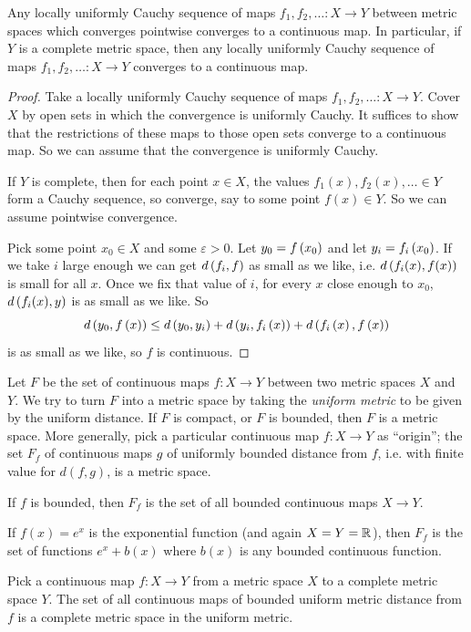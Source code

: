 \begin{lemma}\label{lemma:complete.converg}
Any locally uniformly Cauchy sequence of maps \(f_1, f_2, \dots \colon X \to Y\) between metric spaces which converges pointwise converges to a continuous map.
In particular, if \(Y\) is a complete metric space, then any locally uniformly Cauchy sequence of maps \(f_1, f_2, \dots \colon X \to Y\) converges to a continuous map.
\end{lemma}
\begin{proof}
Take a locally uniformly Cauchy sequence of maps \(f_1, f_2, \dots \colon X \to Y\).
Cover \(X\) by open sets in which the convergence is uniformly Cauchy.
It suffices to show that the restrictions of these maps to those open sets converge to a continuous map.
So we can assume that the convergence is uniformly Cauchy.

If \(Y\) is complete, then for each point \(x \in X\), the values \(f_1(x), f_2(x), \dots \in Y\) form a Cauchy sequence, so converge, say to some point \(f(x) \in Y\).
So we can assume pointwise convergence.

Pick some point \(x_0 \in X\) and some \(\varepsilon > 0\).
Let \(y_0=f\left(x_0\right)\) and let \(y_i=f_i\left(x_0\right)\).
If we take \(i\) large enough we can get \(d\left(f_i,f\right)\) as small as we like, i.e. \(d\left(f_i(x),f(x)\right)\) is small for all \(x\).
Once we fix that value of \(i\), for every \(x\) close enough to \(x_0\), \(d\left(f_i(x),y\right)\) is as small as we like.
So 
\[
d\left(y_0,f\left(x\right)\right) 
\le 
d\left(y_0,y_i\right) 
+
d\left(y_i,f_i\left(x\right)\right) 
+
d\left(f_i\left(x\right),f\left(x\right)\right) 
\]
is as small as we like, so \(f\) is continuous.
\end{proof}
Let \(F\) be the set of continuous maps \(f \colon X \to Y\) between two metric spaces \(X\) and \(Y\).
We try to turn \(F\) into a metric space by taking the \emph{uniform metric} to be given by the uniform distance.
If \(F\) is compact, or \(F\) is bounded, then \(F\) is a metric space.
More generally, pick a particular continuous map \(f \colon X \to Y\) as ``origin''; the set \(F_f\) of continuous maps \(g\) of uniformly bounded distance from \(f\), i.e. with finite value for \(d(f,g)\), is a metric space.
\begin{example}
If \(f\) is bounded, then \(F_f\) is the set of all bounded continuous maps \(X \to Y\).
\end{example}
\begin{example}
If \(f(x)=e^x\) is the exponential function (and again \(X=Y=\mathbb{R}^{}\)), then \(F_f\) is the set of functions \(e^x+b(x)\) where \(b(x)\) is any bounded continuous function.
\end{example}
\begin{corollary}\label{corollary:Zf}
Pick a continuous map \(f \colon X \to Y\) from a metric space \(X\) to a complete metric space \(Y\).
The set of all continuous maps of bounded uniform metric distance from \(f\) is a complete metric space in the uniform metric.
\end{corollary}

